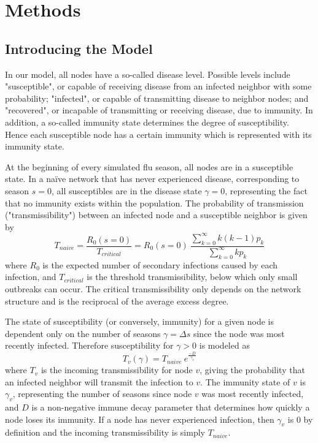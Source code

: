 \documentclass[11pt, a4paper]{article}
\author{Ruben J Kubiak}
\begin{document}
\section{Methods}
\subsection{Introducing the Model}
In our model, all nodes have a so-called disease level. Possible levels include "susceptible",  or capable of receiving disease from an infected neighbor with some probability; "infected", or capable of transmitting disease to neighbor nodes; and "recovered", or incapable of transmitting or receiving disease, due to immunity. In addition, a so-called immunity state determines the degree of susceptibility. Hence each susceptible node has a certain immunity which is represented with its immunity state.

At the beginning of every simulated flu season, all nodes are in a susceptible state. In a na\"ive network that has never experienced disease, corresponding to season $s = 0$, all susceptibles are in the disease state $\gamma = 0$, representing the fact that no immunity exists within the population. The probability of transmission ("transmissibility") between an infected node and a susceptible neighbor is given by
\begin{equation}
T_{naive} =  \frac{R_{0} (s = 0)} {T_{critical}} = R_{0} (s=0) \: \frac {\sum\limits_{k=0}^{\infty} k (k-1) p_k}{ \sum\limits_{k=0}^{\infty} k p_k}
\end{equation}
where $R_{0}$ is the expected number of secondary infections caused by each infection, and $T_{critical}$ is the threshold transmissibility, below which only small outbreaks can occur. The critical transmissibility only depends on the network structure and is the reciprocal of the average excess degree.

The state of susceptibility (or conversely, immunity) for a given node is dependent only on the number of seasons $\gamma = \Delta s$ since the node was most recently infected.  Therefore susceptibility for $\gamma > 0 $ is modeled as
\begin{equation}
T_{v} (\gamma) = T_{naive} \: e^{\frac {-D}{\gamma_{v}}}
\end{equation}
where $T_{v}$ is the incoming transmissibility for node $v$, giving the probability that an infected neighbor will transmit the infection to $v$. The immunity state of $v$ is $\gamma_{v}$, representing the number of seasons since node $v$ was most recently infected, and $D$ is a non-negative immune decay parameter that determines how quickly a node loses its immunity. If a node has never experienced infection, then $\gamma_{v}$ is $0$ by definition and the incoming transmissibility is simply $T_{naive}$.
\end{document}

